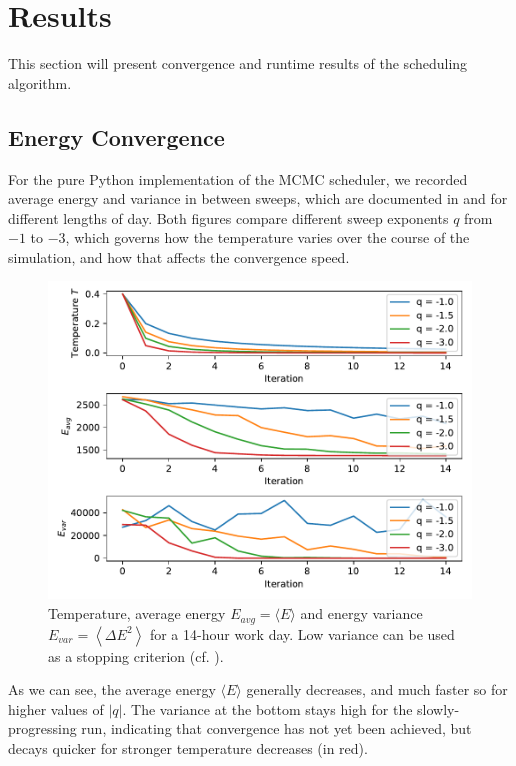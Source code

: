 \section{Results}
\label{sec:results}
This section will present convergence and runtime results of the scheduling algorithm.

\subsection{Energy Convergence}
\label{sec:convergence}
For the pure Python implementation of the MCMC scheduler, we recorded average energy and variance in between sweeps, which are documented in  and  for different lengths of day. Both figures compare different sweep exponents $q$ from $-1$ to $-3$, which governs how the temperature varies over the course of the simulation, and how that affects the convergence speed.

\begin{figure}[H]
  \centering
  \includegraphics[width=0.8\linewidth]{results/convergence-14h-day.pdf}
  \caption{Temperature, average energy $E_{avg} = \langle E \rangle$ and energy variance $E_{var} = \left\langle\Delta E^2\right\rangle$ for a 14-hour work day. Low variance can be used as a stopping criterion (cf. ).}
  \label{fig:convergence-14h}
\end{figure}

As we can see, the average energy $\langle E \rangle$ generally decreases, and much faster so for higher values of $|q|$. The variance at the bottom stays high for the slowly-progressing run, indicating that convergence has not yet been achieved, but decays quicker for stronger temperature decreases (in red).

